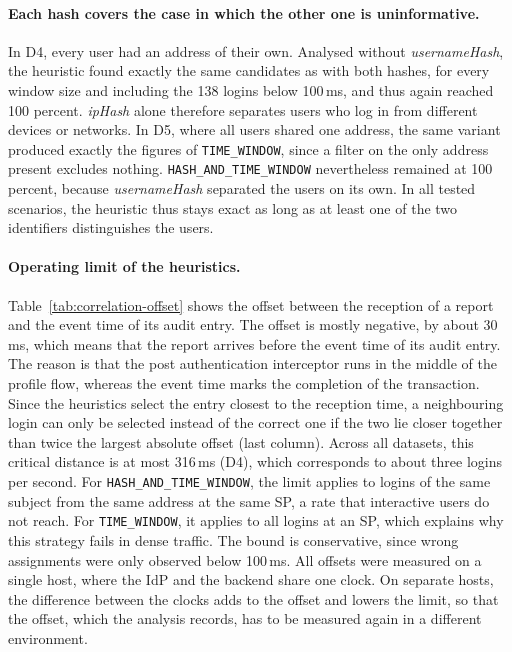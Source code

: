 \documentclass[../main.tex]{subfiles}
\begin{document}
\paragraph{Each hash covers the case in which the other one is uninformative.}
In D4, every user had an address of their own. 
Analysed without \textit{usernameHash}, the heuristic found exactly the same candidates as with both 
hashes, for every window size and including the 138 logins below 100\,ms, and thus again reached 
100 percent. 
\textit{ipHash} alone therefore separates users who log in from different devices or networks. 
In D5, where all users shared one address, the same variant produced exactly the figures of 
\texttt{TIME\_\allowbreak{}WINDOW}, since a filter on the only address present excludes nothing. 
\texttt{HASH\_\allowbreak{}AND\_\allowbreak{}TIME\_\allowbreak{}WINDOW} nevertheless remained at 
100 percent, because \textit{usernameHash} separated the users on its own. 
In all tested scenarios, the heuristic thus stays exact as long as at least one of the two 
identifiers distinguishes the users. 

\paragraph{Operating limit of the heuristics.}
Table~\ref{tab:correlation-offset} shows the offset between the reception of a report and the event 
time of its audit entry. 
The offset is mostly negative, by about 30\,ms, which means that the report arrives before the 
event time of its audit entry. 
The reason is that the post authentication interceptor runs in the middle of the profile flow, 
whereas the event time marks the completion of the transaction. 
Since the heuristics select the entry closest to the reception time, a neighbouring login can only 
be selected instead of the correct one if the two lie closer together than twice the largest 
absolute offset (last column). 
Across all datasets, this critical distance is at most 316\,ms (D4), which corresponds to about 
three logins per second. 
For \texttt{HASH\_\allowbreak{}AND\_\allowbreak{}TIME\_\allowbreak{}WINDOW}, the limit applies to 
logins of the same subject from the same address at the same SP, a rate that interactive users do 
not reach. 
For \texttt{TIME\_\allowbreak{}WINDOW}, it applies to all logins at an SP, which explains why this 
strategy fails in dense traffic. 
The bound is conservative, since wrong assignments were only observed below 100\,ms. 
All offsets were measured on a single host, where the IdP and the backend share one clock. 
On separate hosts, the difference between the clocks adds to the offset and lowers the limit, so 
that the offset, which the analysis records, has to be measured again in a different environment. 
\end{document}
